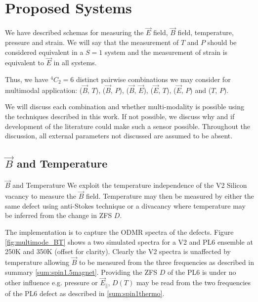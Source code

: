 
%

\section{Proposed Systems}
We have described schemas for measuring the $\vec{E}$ field, $\vec{B}$ field, temperature, pressure and strain. We will say that the measurement of $T$ and $P$ should be considered equivalent in a $S=1$ system and the measurement of strain is equivalent to $\vec{E}$ in all systems.

Thus, we have $^4 C _2 = 6$ distinct pairwise combinations we may consider for multimodal application:
($\vec{B}$, $T$), ($\vec{B}$, $P$), ($\vec{B}$, $\vec{E}$), ($\vec{E}$, $T$), ($\vec{E}$, $P$) and ($T$, $P$).

We will discuss each combination and whether multi-modality is possible using the techniques described in this work.
If not possible, we discuss why and if development of the literature could make such a sensor possible. Throughout the discussion, all external parameters not discussed are assumed to be absent.

\subsection{$\vec{B}$ and Temperature}\label{sec:multimode_BT}
\begin{proposal}{$\vec{B}$ and Temperature}
	We exploit the temperature independence of the V2 Silicon vacancy to measure the $\vec{B}$ field. Temperature may then be measured by either the same defect using anti-Stokes technique or a divacancy where temperature may be inferred from the change in ZFS $D$.
\end{proposal}
The implementation is to capture the ODMR spectra of the defects. Figure \ref{fig:multimode_BT} shows a two simulated spectra for a V2 and PL6 ensemble at 250K and 350K (offset for clarity). Clearly the V2 spectra is unaffected by temperature allowing $\vec{B}$ to be measured from the three frequencies as described in summary \ref{sum:spin1.5magnet}. Providing the ZFS $D$ of the PL6 is under no other influence e.g. pressure or $\vec{E}_\parallel$, $D(T)$ may be read from the two frequencies of the PL6 defect as described in \ref{sum:spin1thermo}.


